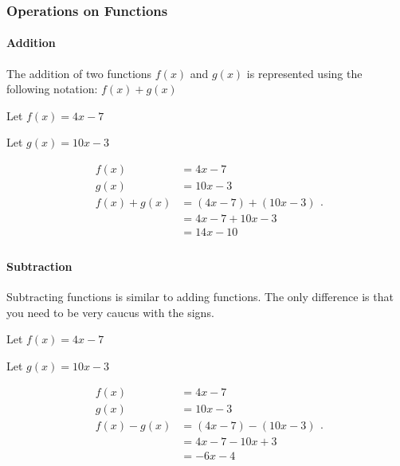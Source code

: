
\subsubsection{Operations on Functions}
\label{sub_sub_sec:operations_on_functions}

\paragraph{Addition}
\label{par:addition}

The addition of two functions $f(x)$ and $g(x)$ is represented using the
following notation: $f(x) + g(x)$

\begin{example}
  \label{exm:addition}

  Let $f(x) = 4x - 7$
  
  Let $g(x) = 10x - 3$
  
  \begin{equation}
    \label{eqt:addition_1}
    \begin{split}
      f(x) &= 4x - 7 \\
      g(x) &= 10x - 3 \\
      f(x) + g(x) &= (4x - 7) + (10x - 3) \\
                  &= 4x - 7 + 10x - 3 \\
                  &= \boxed{14x - 10} \\
    \end{split}
  .\end{equation}
\end{example}


\paragraph{Subtraction}
\label{par:subtraction}

Subtracting functions is similar to adding functions. The only difference is
that you need to be very caucus with the signs.

\begin{example}
  \label{exm:subtraction}

  Let $f(x) = 4x - 7$
  
  Let $g(x) = 10x - 3$
  
  \begin{equation}
    \label{eqt:addition_1}
    \begin{split}
      f(x) &= 4x - 7 \\
      g(x) &= 10x - 3 \\
      f(x) - g(x) &= (4x - 7) - (10x - 3) \\
                  &= 4x - 7 - 10x + 3 \\
                  &= \boxed{-6x - 4} \\
    \end{split}
  .\end{equation}
\end{example}

